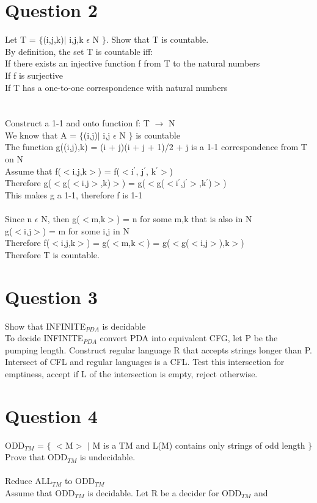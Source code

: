 \documentclass[10pt,a4paper]{article}
\begin{document}
\section*{Question 2}
Let T = $\lbrace$(i,j,k)$\mid$ i,j,k $\epsilon$ N $\rbrace$. Show that T is countable.\\
By definition, the set T is countable iff:\\
If there exists an injective function f from T to the natural numbers\\
If f is surjective\\
If T has a one-to-one correspondence with natural numbers\\
\\\\
Construct a 1-1 and onto function f: T $\rightarrow$ N\\
We know that A = $\lbrace$(i,j)$\mid$ i,j $\epsilon$ N $\rbrace$ is countable\\
The function g((i,j),k) = (i + j)(i + j + 1)/2 + j is a 1-1 correspondence from T on N\\
Assume that f($<$i,j,k$>$) = f($<$i$^{'}$, j$^{'}$, k$^{'}$$>$)\\
Therefore g($<$g($<$i,j$>$,k)$>$) = g($<$g($<$i$^{'}$,j$^{'}$$>$,k$^{'}$)$>$)\\
This makes g a 1-1, therefore f is 1-1\\
\\
Since n $\epsilon$ N, then g($<$m,k$>$) = n for some m,k that is also in N\\
g($<$i,j$>$) = m for some i,j in N\\
Therefore f($<$i,j,k$>$) = g($<$m,k$<$) = g($<$g($<$i,j$>$),k$>$)\\
Therefore T is countable.
\section*{Question 3}
Show that INFINITE$_{PDA}$ is decidable\\
To decide INFINITE$_{PDA}$ convert PDA into equivalent CFG, let P be the pumping length. Construct regular language R that accepts strings longer than P. Intersect of CFL and regular languages is a CFL. Test this intersection for emptiness, accept if L of the intersection is empty, reject otherwise.
\section*{Question 4}
ODD$_{TM}$ = $\lbrace$ $<$M$>$ $\mid$ M is a TM and L(M) contains only strings of odd length $\rbrace$
Prove that ODD$_{TM}$ is undecidable.\\
\\
Reduce ALL$_{TM}$ to ODD$_{TM}$\\
Assume that ODD$_{TM}$ is decidable. Let R be a decider for ODD$_{TM}$ and 
\end{document}
